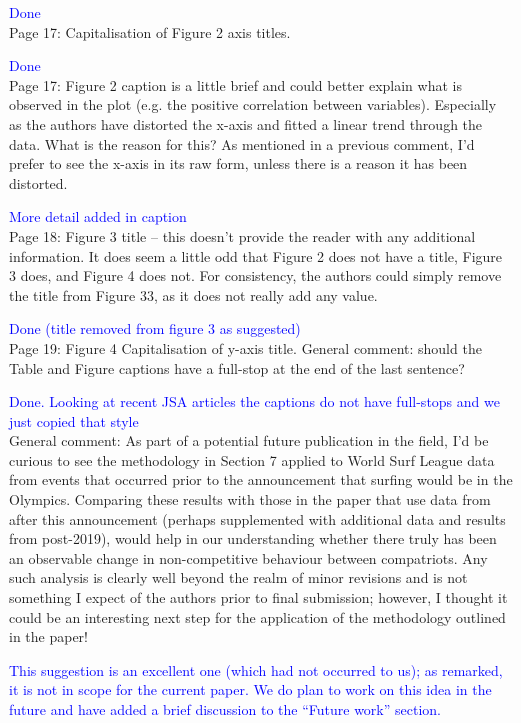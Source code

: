 \documentclass[12pt]{article}
\begin{document}
\textcolor{blue}{Done}\\

Page 17: Capitalisation of Figure 2 axis titles.

\textcolor{blue}{Done}\\

Page 17: Figure 2 caption is a little brief and could better explain
what is observed in the plot (e.g. the positive correlation between
variables). Especially as the authors have distorted the x-axis and
fitted a linear trend through the data. What is the reason for this?
As mentioned in a previous comment, I’d prefer to see the x-axis in
its raw form, unless there is a reason it has been distorted.

\textcolor{blue}{More detail added in caption}\\



Page 18: Figure 3 title – this doesn’t provide the reader with any
additional information. It does seem a little odd that Figure 2 does
not have a title, Figure 3 does, and Figure 4 does not. For
consistency, the authors could simply remove the title from Figure 33,
as it does not really add any value.

\textcolor{blue}{Done (title removed from figure 3 as suggested)}\\

Page 19: Figure 4 Capitalisation of y-axis title.  General comment:
should the Table and Figure captions have a full-stop at the end of
the last sentence?

\textcolor{blue}{Done.  Looking at recent JSA articles the captions do
  not have full-stops and we just copied that style}\\


General comment: As part of a potential future publication in the
field, I'd be curious to see the methodology in Section 7 applied to
World Surf League data from events that occurred prior to the
announcement that surfing would be in the Olympics.  Comparing these
results with those in the paper that use data from after this
announcement (perhaps supplemented with additional data and results
from post-2019), would help in our understanding whether there truly
has been an observable change in non-competitive behaviour between
compatriots.  Any such analysis is clearly well beyond the realm of
minor revisions and is not something I expect of the authors prior to
final submission; however, I thought it could be an interesting next
step for the application of the methodology outlined in the paper!

\textcolor{blue}{This suggestion is an excellent one (which had not
  occurred to us); as remarked, it is not in scope for the current
  paper.  We do plan to work on this idea in the future and have added
  a brief discussion to the ``Future work'' section.}
\end{document}
